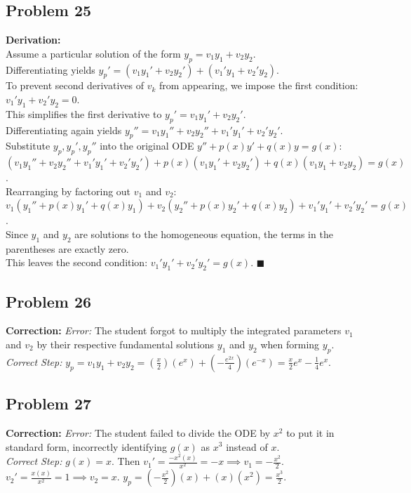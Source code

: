 \documentclass[11pt]{article}
\begin{document}
\subsection*{Problem 25}
\textbf{Derivation:} \\
Assume a particular solution of the form $y_p = v_1y_1 + v_2y_2$. \\
Differentiating yields $y_p' = (v_1y_1' + v_2y_2') + (v_1'y_1 + v_2'y_2)$. \\
To prevent second derivatives of $v_k$ from appearing, we impose the first condition: $v_1'y_1 + v_2'y_2 = 0$. \\
This simplifies the first derivative to $y_p' = v_1y_1' + v_2y_2'$. \\
Differentiating again yields $y_p'' = v_1y_1'' + v_2y_2'' + v_1'y_1' + v_2'y_2'$. \\
Substitute $y_p, y_p', y_p''$ into the original ODE $y'' + p(x)y' + q(x)y = g(x)$: \\
$(v_1y_1'' + v_2y_2'' + v_1'y_1' + v_2'y_2') + p(x)(v_1y_1' + v_2y_2') + q(x)(v_1y_1 + v_2y_2) = g(x)$. \\
Rearranging by factoring out $v_1$ and $v_2$: \\
$v_1(y_1'' + p(x)y_1' + q(x)y_1) + v_2(y_2'' + p(x)y_2' + q(x)y_2) + v_1'y_1' + v_2'y_2' = g(x)$. \\
Since $y_1$ and $y_2$ are solutions to the homogeneous equation, the terms in the parentheses are exactly zero. \\
This leaves the second condition: $v_1'y_1' + v_2'y_2' = g(x)$. $\blacksquare$

\subsection*{Problem 26}
\textbf{Correction:} \textit{Error:} The student forgot to multiply the integrated parameters $v_1$ and $v_2$ by their respective fundamental solutions $y_1$ and $y_2$ when forming $y_p$. \\
\textit{Correct Step:} $y_p = v_1y_1 + v_2y_2 = (\frac{x}{2})(e^x) + (-\frac{e^{2x}}{4})(e^{-x}) = \frac{x}{2}e^x - \frac{1}{4}e^x$.

\subsection*{Problem 27}
\textbf{Correction:} \textit{Error:} The student failed to divide the ODE by $x^2$ to put it in standard form, incorrectly identifying $g(x)$ as $x^3$ instead of $x$. \\
\textit{Correct Step:} $g(x) = x$. Then $v_1' = \frac{-x^2(x)}{x^2} = -x \implies v_1 = -\frac{x^2}{2}$. $v_2' = \frac{x(x)}{x^2} = 1 \implies v_2 = x$. $y_p = (-\frac{x^2}{2})(x) + (x)(x^2) = \frac{x^3}{2}$.
\end{document}
